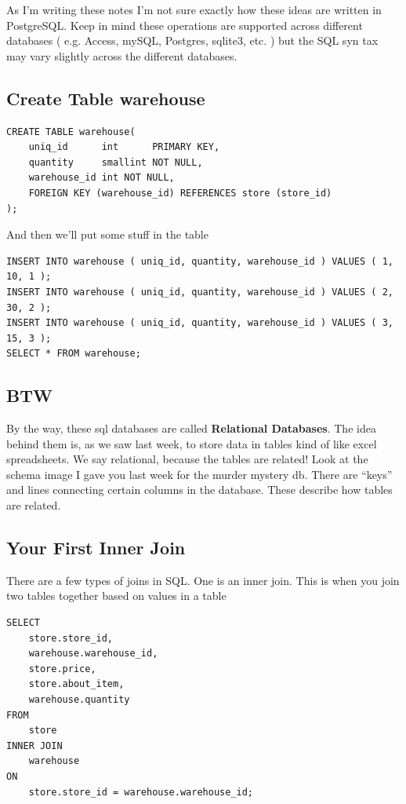 \documentclass[12pt,a4paper]{article}
\begin{document}
As I'm writing these notes I'm not sure exactly how these ideas are written in
PostgreSQL. Keep in mind these operations are supported across different
databases ( e.g. Access, mySQL, Postgres, sqlite3, etc. ) but the SQL syn tax
may vary slightly across the different databases.

\subsection{ Create Table warehouse }

\begin{lstlisting}
CREATE TABLE warehouse(
	uniq_id      int      PRIMARY KEY,
	quantity     smallint NOT NULL,
	warehouse_id int NOT NULL,
	FOREIGN KEY (warehouse_id) REFERENCES store (store_id)
);
\end{lstlisting}

And then we'll put some stuff in the table

\begin{lstlisting}
INSERT INTO warehouse ( uniq_id, quantity, warehouse_id ) VALUES ( 1, 10, 1 );
INSERT INTO warehouse ( uniq_id, quantity, warehouse_id ) VALUES ( 2, 30, 2 );
INSERT INTO warehouse ( uniq_id, quantity, warehouse_id ) VALUES ( 3, 15, 3 );
SELECT * FROM warehouse;
\end{lstlisting}

\subsection{BTW}
By the way, these sql databases are called \textbf{Relational Databases}. The
idea behind them is, as we saw last week, to store data in tables kind of like
excel spreadsheets. We say relational, because the tables are related! Look at
the schema image I gave you last week for the murder mystery db. There are
``keys'' and lines connecting certain columns in the database. These describe
how tables are related. 

\subsection{ Your First Inner Join }

There are a few types of joins in SQL. One is an inner join. This is when you
join two tables together based on values in a table

\begin{lstlisting}
SELECT 
	store.store_id,
	warehouse.warehouse_id,
	store.price,
	store.about_item,
	warehouse.quantity
FROM
	store
INNER JOIN
	warehouse
ON
	store.store_id = warehouse.warehouse_id;
\end{lstlisting}
\end{document}
